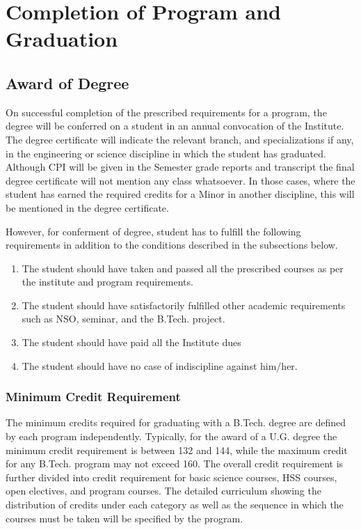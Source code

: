 \section{Completion of Program and Graduation}

\subsection{Award of Degree}

On successful completion of the prescribed requirements for a program, the degree will be conferred on a student in an annual convocation of the Institute. The degree certificate will indicate the relevant branch, and specializations if any, in the engineering or science discipline in which the student has graduated. Although CPI will be given in the Semester grade reports and transcript the final degree certificate will not mention any class whatsoever. In those cases, where the student has earned the required credits for a Minor in another discipline, this will be mentioned in the degree certificate.

However, for conferment of degree, student has to fulfill the following requirements in addition to the conditions described in the subsections below. 

\begin{enumerate}
    \item The student should have taken and passed all the prescribed courses as per the institute and program requirements. 
    \item The student should have satisfactorily fulfilled other academic requirements such as NSO, seminar, and the B.Tech. project. 
    \item The student should have paid all the Institute dues 
    \item The student should have no case of indiscipline against him/her.
\end{enumerate}

\subsubsection{Minimum Credit Requirement}

The minimum credits required for graduating with a B.Tech. degree are defined by each program independently. Typically, for the award of a U.G. degree the minimum credit requirement is between 132 and 144, while the maximum credit for any B.Tech. program may not exceed 160. The overall credit requirement is further divided into credit requirement for basic science courses, HSS courses, open electives, and program courses. The detailed curriculum showing the distribution of credits under each category as well as the sequence in which the courses must be taken will be specified by the program.

